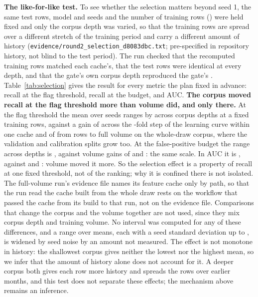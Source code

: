 \textbf{The like-for-like test.} To see whether the selection matters beyond seed 1, the same test
rows, model and seeds and the number of training rows (\nTrainUsed{}) were held fixed and only the
corpus depth was varied, so that the training rows are spread over a different stretch of the training period and
carry a different amount of history (\texttt{evidence/\allowbreak round2\_\allowbreak selection\_\allowbreak d8083dbc.txt};
pre-specified in repository history, not blind to the test period). The run checked that the
recomputed training rows matched each cache's, that the test rows were identical at every depth, and
that the gate's own corpus depth reproduced the gate's \nGateRecallSix{}. Table~\ref{tab:selection}
gives the result for every metric the plan fixed in advance: recall at the flag threshold,
recall at the \nFPRBudget{} budget, and AUC. \textbf{The corpus moved recall at the flag threshold
more than volume did, and only there.} At the flag threshold the mean over \nSeeds{} seeds ranges by
\nSelMeanRange{} across corpus depths at a fixed \nTrainUsed{} training rows, against a gain of
\nLcSeedGainAC{} across the \nLcVolumeFactorAC{}-fold step of the learning curve within one cache and
of \nFvSeedGainFixed{} from \nTrainUsed{} rows to full volume on the whole-draw corpus, where the
validation and calibration splits grow too. At the false-positive budget the range across depths is
\nSelBudgetRange{}, against volume gains of \nLcSeedBudgetGainAC{} and \nFvSeedBudgetGainFixed{}: the
same scale. In AUC it is \nSelAucRange{}, against \nLcSeedAucGainAC{} and \nFvSeedAucGainFixed{}:
volume moved it more. So the selection effect is a property of recall at one fixed threshold, not of
the ranking; why it is confined there is not isolated. The full-volume run's evidence file names its feature cache only by path, so
that the run read the cache built from the whole draw rests on the workflow that passed the cache
from its build to that run, not on the evidence file. Comparisons that change the corpus and the volume together are not used, since
they mix corpus depth and training volume. No interval was computed for any of these differences, and a range over
\nSelDepthCount{} means, each with a seed standard deviation up to \nSelMaxSd{}, is widened by seed
noise by an amount not measured. The effect is not monotone in history: the shallowest corpus gives neither the lowest
nor the highest mean, so we infer that the amount of history alone does not account for it. A deeper corpus both
gives each row more history and spreads the rows over earlier months, and this test does not separate
these effects; the mechanism above remains an inference.

